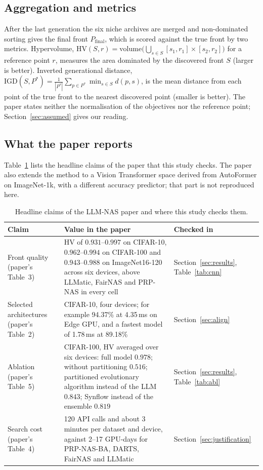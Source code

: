 \documentclass[pdflatex,sn-mathphys-ay]{sn-jnl}
\newcommand{\HV}{\mathrm{HV}}
\newcommand{\IGD}{\mathrm{IGD}}
\begin{document}
\subsection{Aggregation and metrics}
After the last generation the six niche archives are merged and non-dominated sorting gives the final front $P_{\mathrm{final}}$, which is scored against the true front by two metrics. Hypervolume, $\HV(S,r)=\mathrm{volume}\big(\bigcup_{s\in S}[s_1,r_1]\times[s_2,r_2]\big)$ for a reference point $r$, measures the area dominated by the discovered front $S$ (larger is better). Inverted generational distance, $\IGD(S,P^\ast)=\frac{1}{|P^\ast|}\sum_{p\in P^\ast}\min_{s\in S}d(p,s)$, is the mean distance from each point of the true front to the nearest discovered point (smaller is better). The paper states neither the normalisation of the objectives nor the reference point; Section~\ref{sec:assumed} gives our reading.

\subsection{What the paper reports}
Table~\ref{tab:claims} lists the headline claims of the paper that this study checks. The paper also extends the method to a Vision Transformer space derived from AutoFormer on ImageNet-1k, with a different accuracy predictor; that part is not reproduced here.

\begin{table}[h]\centering\footnotesize\setlength{\tabcolsep}{3pt}
\caption{Headline claims of the LLM-NAS paper and where this study checks them.}\label{tab:claims}
\begin{tabular}{p{2.7cm}p{6.4cm}p{2.3cm}}
\toprule
Claim & Value in the paper & Checked in \\
\midrule
Front quality (paper's Table~3) & HV of $0.931$--$0.997$ on CIFAR-10, $0.962$--$0.994$ on CIFAR-100 and $0.943$--$0.988$ on ImageNet16-120 across six devices, above LLMatic, FairNAS and PRP-NAS in every cell & Section~\ref{sec:results}, Table~\ref{tab:cnn} \\
Selected architectures (paper's Table~2) & CIFAR-10, four devices; for example 94.37\% at 4.35\,ms on Edge GPU, and a fastest model of 1.78\,ms at 89.18\% & Section~\ref{sec:align} \\
Ablation (paper's Table~5) & CIFAR-100, HV averaged over six devices: full model $0.978$; without partitioning $0.516$; partitioned evolutionary algorithm instead of the LLM $0.843$; Synflow instead of the ensemble $0.819$ & Section~\ref{sec:results}, Table~\ref{tab:abl} \\
Search cost (paper's Table~4) & 120 API calls and about 3 minutes per dataset and device, against 2--17 GPU-days for PRP-NAS-BA, DARTS, FairNAS and LLMatic & Section~\ref{sec:justification} \\
\bottomrule
\end{tabular}
\end{table}
\end{document}
